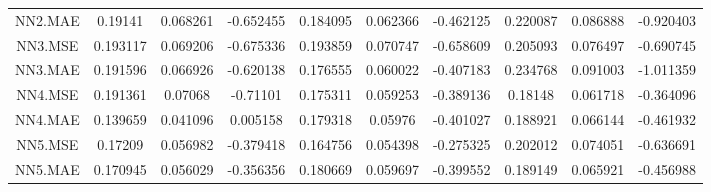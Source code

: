 \begin{longtable}[t]{cccccccccc}
NN2.MAE & 0.19141 & 0.068261 & -0.652455 & 0.184095 & 0.062366 & -0.462125 & 0.220087 & 0.086888 & -0.920403\\
\addlinespace
NN3.MSE & 0.193117 & 0.069206 & -0.675336 & 0.193859 & 0.070747 & -0.658609 & 0.205093 & 0.076497 & -0.690745\\
NN3.MAE & 0.191596 & 0.066926 & -0.620138 & 0.176555 & 0.060022 & -0.407183 & 0.234768 & 0.091003 & -1.011359\\
NN4.MSE & 0.191361 & 0.07068 & -0.71101 & 0.175311 & 0.059253 & -0.389136 & 0.18148 & 0.061718 & -0.364096\\
NN4.MAE & 0.139659 & 0.041096 & 0.005158 & 0.179318 & 0.05976 & -0.401027 & 0.188921 & 0.066144 & -0.461932\\
NN5.MSE & 0.17209 & 0.056982 & -0.379418 & 0.164756 & 0.054398 & -0.275325 & 0.202012 & 0.074051 & -0.636691\\
\addlinespace
NN5.MAE & 0.170945 & 0.056029 & -0.356356 & 0.180669 & 0.059697 & -0.399552 & 0.189149 & 0.065921 & -0.456988\\*
\end{longtable}
\endgroup{}